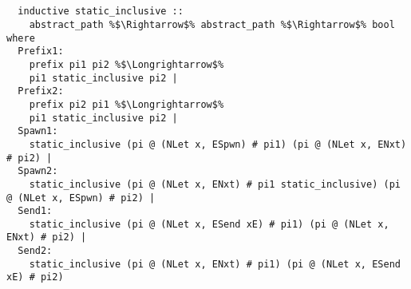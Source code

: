 \documentclass{article}
\begin{document}
\begin{lstlisting}[style=codestyle1, escapechar=\%]

  
  inductive static_inclusive ::
    abstract_path %$\Rightarrow$% abstract_path %$\Rightarrow$% bool where
  Prefix1:
    prefix pi1 pi2 %$\Longrightarrow$%
    pi1 static_inclusive pi2 |
  Prefix2:
    prefix pi2 pi1 %$\Longrightarrow$%
    pi1 static_inclusive pi2 |
  Spawn1:
    static_inclusive (pi @ (NLet x, ESpwn) # pi1) (pi @ (NLet x, ENxt) # pi2) |
  Spawn2:
    static_inclusive (pi @ (NLet x, ENxt) # pi1 static_inclusive) (pi @ (NLet x, ESpwn) # pi2) |
  Send1: 
    static_inclusive (pi @ (NLet x, ESend xE) # pi1) (pi @ (NLet x, ENxt) # pi2) |
  Send2:
    static_inclusive (pi @ (NLet x, ENxt) # pi1) (pi @ (NLet x, ESend xE) # pi2)
    
  \end{lstlisting}
\end{document}
